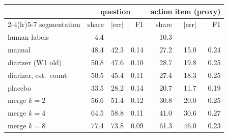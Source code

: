 \begin{tabular}{@{}lrrrrrr@{}}
\toprule
& \multicolumn{3}{c}{question} & \multicolumn{3}{c}{action item (proxy)} \\
\cmidrule(lr){2-4}\cmidrule(lr){5-7}
segmentation & share & $|$err$|$ & F1 & share & $|$err$|$ & F1 \\
\midrule
human labels & 4.4 & & & 10.3 & & \\
\midrule
manual & 48.4 & 42.3 & 0.14 & 27.2 & 15.0 & 0.24 \\
diarizer (W1 old) & 50.8 & 47.6 & 0.10 & 28.7 & 19.8 & 0.25 \\
diarizer, est.\ count & 50.5 & 45.4 & 0.11 & 27.4 & 18.3 & 0.25 \\
placebo & 33.5 & 28.2 & 0.14 & 20.7 & 11.7 & 0.19 \\
merge $k=2$ & 56.6 & 51.4 & 0.12 & 30.8 & 20.0 & 0.25 \\
merge $k=4$ & 64.5 & 58.8 & 0.11 & 41.0 & 30.6 & 0.27 \\
merge $k=8$ & 77.4 & 73.8 & 0.09 & 61.3 & 46.0 & 0.23 \\
\bottomrule
\end{tabular}
